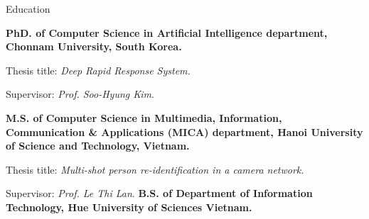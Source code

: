 \begin{rubric}{Education}

\entry*[03/2021 -- present]%
	\textbf{PhD. of Computer Science in Artificial Intelligence department, Chonnam University, South Korea.}\par
    Thesis title: \emph{Deep Rapid Response System.}\par
    Supervisor: \emph{Prof. Soo-Hyung Kim}.

\entry*[10/2018 -- 09/2020]%
	\textbf{M.S. of Computer Science in Multimedia, Information, Communication \& Applications (MICA) department, Hanoi University of Science and Technology, Vietnam.}\par
    Thesis title: \emph{Multi-shot person re-identification in a camera network.}\par
    Supervisor: \emph{Prof. Le Thi Lan}.
%
\entry*[09/2014 -- 09/2018]%
	\textbf{B.S. of Department of Information Technology, Hue University of Sciences Vietnam.}
%
\end{rubric}
